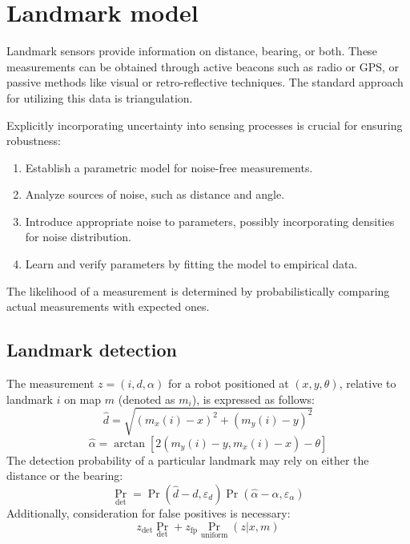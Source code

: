 \section{Landmark model}

Landmark sensors provide information on distance, bearing, or both. 
These measurements can be obtained through active beacons such as radio or GPS, or passive methods like visual or retro-reflective techniques.
The standard approach for utilizing this data is triangulation.

Explicitly incorporating uncertainty into sensing processes is crucial for ensuring robustness:
\begin{enumerate}
    \item Establish a parametric model for noise-free measurements.
    \item Analyze sources of noise, such as distance and angle.
    \item Introduce appropriate noise to parameters, possibly incorporating densities for noise distribution.
    \item Learn and verify parameters by fitting the model to empirical data.
\end{enumerate}
The likelihood of a measurement is determined by probabilistically comparing actual measurements with expected ones.

\subsection{Landmark detection}
The measurement $z = (i, d, \alpha)$ for a robot positioned at $(x, y, \theta)$, relative to landmark $i$ on map $m$ (denoted as $m_i$), is expressed as follows:
\[\hat{d}=\sqrt{{\left(m_x(i)-x\right)}^2+{\left(m_y(i)-y\right)}^2}\]
\[\hat{\alpha}=\arctan\left[2(m_y(i)-y,m_x(i)-x)-\theta\right]\]
The detection probability of a particular landmark may rely on either the distance or the bearing:
\[\Pr_{\text{det}}=\Pr(\hat{d}-d,\varepsilon_d)\Pr(\hat{\alpha}-\alpha,\varepsilon_\alpha)\]
Additionally, consideration for false positives is necessary:
\[z_{\text{det}}\Pr_{\text{det}}+z_{\text{fp}}\Pr_{\text{uniform}}(z|x,m)\]